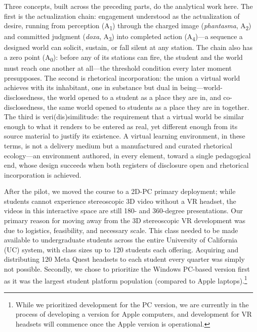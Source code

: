 
Three concepts, built across the preceding parts, do the analytical work here.
The first is the actualization chain: engagement understood as the actualization
of desire, running from perception (A\textsubscript{1}) through the charged
image (\textit{phantasma}, A\textsubscript{2}) and committed judgment
(\textit{doxa}, A\textsubscript{3}) into completed action
(A\textsubscript{4})---a sequence a designed world can solicit, sustain, or
fall silent at any station. The chain also has a zero point
(A\textsubscript{0}): before any of its stations can fire, the student and the
world must reach one another at all---the threshold condition every later
moment presupposes. The second is rhetorical incorporation: the union a virtual world
achieves with its inhabitant, one in substance but dual in
being---world-disclosedness, the world opened to a student as a place they are
in, and co-disclosedness, the same world opened to students as a place they are
in together. The third is veri(dis)similitude: the requirement that a virtual
world be similar enough to what it renders to be entered as real, yet different
enough from its source material to justify its existence. A virtual learning
environment, in these terms, is not a delivery medium but a manufactured and
curated rhetorical ecology---an environment authored, in every element, toward a
single pedagogical end, whose design succeeds when both registers of disclosure
open and rhetorical incorporation is achieved.


After the pilot, we moved the course to a 2D-PC primary
deployment; while students cannot experience stereoscopic 3D video without a VR
headset, the videos in this interactive space are still 180- and 360-degree
presentations. Our primary reason for moving away from the 3D stereoscopic VR
development was due to logistics, feasibility, and necessary scale. This class
needed to be made available to undergraduate students across the entire
University of California (UC) system, with class sizes up to 120 students each
offering. Acquiring and distributing 120 Meta Quest headsets to each student
every quarter was simply not possible. Secondly, we chose to prioritize the
Windows PC-based version first as it was the largest student platform population
(compared to Apple laptops).\footnote{While we prioritized development for the
PC version, we are currently in the process of developing a version for Apple
computers, and development for VR headsets will commence once the Apple version
is operational.}

